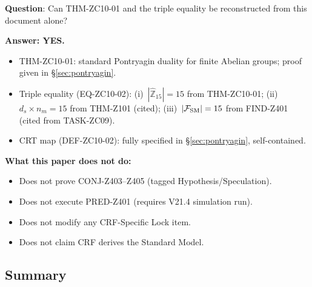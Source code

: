 \documentclass[12pt, a4paper]{article}
\begin{document}
\begin{formalbox}[title={Reconstruction Test (CUIP No-Loss)}]
\textbf{Question}: Can THM-ZC10-01 and the triple equality
be reconstructed from this document alone?

\textbf{Answer: YES.}
\begin{itemize}[leftmargin=*]
  \item THM-ZC10-01: standard Pontryagin duality for finite
    Abelian groups; proof given in \S\ref{sec:pontryagin}.
  \item Triple equality (EQ-ZC10-02):
    (i)~$|\hat{\mathbb{Z}}_{15}|=15$ from THM-ZC10-01;
    (ii)~$d_s \times n_m = 15$ from THM-Z101 (cited);
    (iii)~$|\mathcal{F}_{\rm SM}|=15$ from FIND-Z401 (cited
    from TASK-ZC09).
  \item CRT map (DEF-ZC10-02): fully specified in
    \S\ref{sec:pontryagin}, self-contained.
\end{itemize}

\textbf{What this paper does not do:}
\begin{itemize}[leftmargin=*]
  \item Does not prove CONJ-Z403--Z405 (tagged Hypothesis/Speculation).
  \item Does not execute PRED-Z401 (requires V21.4 simulation run).
  \item Does not modify any CRF-Specific Lock item.
  \item Does not claim CRF derives the Standard Model.
\end{itemize}
\end{formalbox}

\subsection{Summary}
\label{sec:summary}
\end{document}
